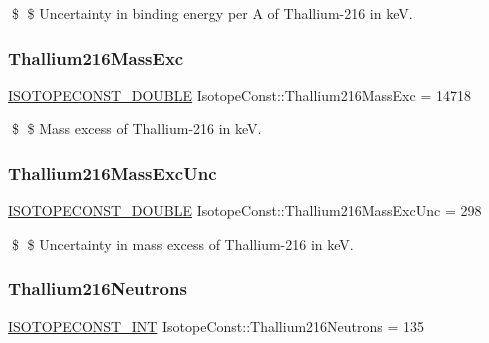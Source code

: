 \$ \$ Uncertainty in binding energy per A of Thallium-\/216 in keV. \mbox{\label{group___isotope_const-_thallium-_tl216_gace275025c8c7ffa7df6628a325dd89be}} 
\subsubsection{\texorpdfstring{Thallium216\+Mass\+Exc}{Thallium216MassExc}}
{\footnotesize\ttfamily \mbox{\hyperlink{group___isotope_const-_macros_ga8f45a7272ce02c0b4c65c44636ed719a}{I\+S\+O\+T\+O\+P\+E\+C\+O\+N\+S\+T\+\_\+\+D\+O\+U\+B\+LE}} Isotope\+Const\+::\+Thallium216\+Mass\+Exc = 14718}

\$ \$ Mass excess of Thallium-\/216 in keV. \mbox{\label{group___isotope_const-_thallium-_tl216_ga1676ccf02736b2845cc7c14f356f945f}} 
\subsubsection{\texorpdfstring{Thallium216\+Mass\+Exc\+Unc}{Thallium216MassExcUnc}}
{\footnotesize\ttfamily \mbox{\hyperlink{group___isotope_const-_macros_ga8f45a7272ce02c0b4c65c44636ed719a}{I\+S\+O\+T\+O\+P\+E\+C\+O\+N\+S\+T\+\_\+\+D\+O\+U\+B\+LE}} Isotope\+Const\+::\+Thallium216\+Mass\+Exc\+Unc = 298}

\$ \$ Uncertainty in mass excess of Thallium-\/216 in keV. \mbox{\label{group___isotope_const-_thallium-_tl216_ga6ce7ed1a7c0faf3c8599b43078299d9f}} 
\subsubsection{\texorpdfstring{Thallium216\+Neutrons}{Thallium216Neutrons}}
{\footnotesize\ttfamily \mbox{\hyperlink{group___isotope_const-_macros_ga5f18360b3e99483a35c32d789e62621c}{I\+S\+O\+T\+O\+P\+E\+C\+O\+N\+S\+T\+\_\+\+I\+NT}} Isotope\+Const\+::\+Thallium216\+Neutrons = 135}

